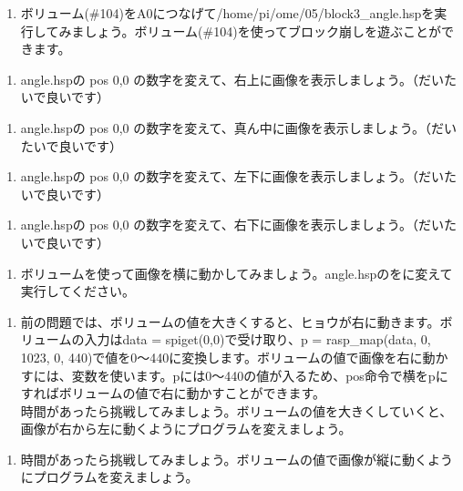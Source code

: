 \begin{tcolorbox}[title=\useOmetoi]
\begin{enumerate}
\item ボリューム(\#104)をA0につなげて/home/pi/ome/05/block3\_angle.hspを実行してみましょう。ボリューム(\#104)を使ってブロック崩しを遊ぶことができます。
\end{enumerate}
\end{tcolorbox}
\begin{tcolorbox}[title=\useOmetoi]
\begin{enumerate}
\item angle.hspの pos 0,0 の数字を変えて、右上に画像を表示しましょう。（だいたいで良いです）
\end{enumerate}
\end{tcolorbox}
\begin{tcolorbox}[title=\useOmetoi]
\begin{enumerate}
\item angle.hspの pos 0,0 の数字を変えて、真ん中に画像を表示しましょう。（だいたいで良いです）
\end{enumerate}
\end{tcolorbox}
\begin{tcolorbox}[title=\useOmetoi]
\begin{enumerate}
\item angle.hspの pos 0,0 の数字を変えて、左下に画像を表示しましょう。（だいたいで良いです）
\end{enumerate}
\end{tcolorbox}
\begin{tcolorbox}[title=\useOmetoi]
\begin{enumerate}
\item angle.hspの pos 0,0 の数字を変えて、右下に画像を表示しましょう。（だいたいで良いです）
\end{enumerate}
\end{tcolorbox}
\begin{tcolorbox}[title=\useOmetoi]
\begin{enumerate}
\item ボリュームを使って画像を横に動かしてみましょう。angle.hspのをに変えて実行してください。
\end{enumerate}
\end{tcolorbox}
\begin{tcolorbox}[title=\useOmetoiAlpha]
\begin{enumerate}
\item 前の問題では、ボリュームの値を大きくすると、ヒョウが右に動きます。ボリュームの入力はdata = spiget(0,0)で受け取り、p = rasp\_map(data, 0, 1023, 0, 440)で値を0～440に変換します。ボリュームの値で画像を右に動かすには、変数を使います。pには0～440の値が入るため、pos命令で横をpにすればボリュームの値で右に動かすことができます。\\
時間があったら挑戦してみましょう。ボリュームの値を大きくしていくと、画像が右から左に動くようにプログラムを変えましょう。
\end{enumerate}
\end{tcolorbox}
\begin{tcolorbox}[title=\useOmetoiAlpha]
\begin{enumerate}
\item 時間があったら挑戦してみましょう。ボリュームの値で画像が縦に動くようにプログラムを変えましょう。
\end{enumerate}
\end{tcolorbox}